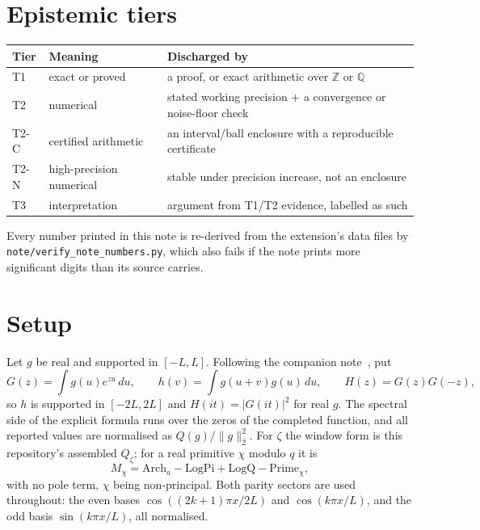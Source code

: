 \documentclass[11pt,a4paper]{article}
\theoremstyle{remark}
\newcommand{\src}[1]{{\footnotesize\texttt{#1}}}
\begin{document}
\section*{Epistemic tiers}

\begin{center}
\begin{tabular}{@{}lll@{}}
\toprule
Tier & Meaning & Discharged by \\
\midrule
T1 & exact or proved & a proof, or exact arithmetic over $\mathbb{Z}$ or $\mathbb{Q}$ \\
T2 & numerical & stated working precision $+$ a convergence or noise-floor check \\
T2-C & certified arithmetic & an interval/ball enclosure with a reproducible certificate \\
T2-N & high-precision numerical & stable under precision increase, not an enclosure \\
T3 & interpretation & argument from T1/T2 evidence, labelled as such \\
\bottomrule
\end{tabular}
\end{center}

\noindent Every number printed in this note is re-derived from the extension's data files
by \src{note/verify\_note\_numbers.py}, which also fails if the note prints more
significant digits than its source carries.

\section{Setup}\label{sec:setup}

Let $g$ be real and supported in $[-L,L]$. Following the companion note~\cite[\S2]{DHnote},
put
\[
G(z)=\int g(u)e^{zu}\,du,\qquad h(v)=\int g(u+v)g(u)\,du,\qquad H(z)=G(z)G(-z),
\]
so $h$ is supported in $[-2L,2L]$ and $H(it)=|G(it)|^2$ for real $g$. The spectral side of
the explicit formula runs over the zeros of the completed function, and all reported values
are normalised as $Q(g)/\|g\|_2^2$. For $\zeta$ the window form is this repository's
assembled $Q_\zeta$; for a real primitive $\chi$ modulo $q$ it is
\[
M_\chi=\mathrm{Arch}_a-\mathrm{LogPi}+\mathrm{LogQ}-\mathrm{Prime}_\chi ,
\]
with no pole term, $\chi$ being non-principal. Both parity sectors are used throughout:
the even bases $\cos((2k+1)\pi x/2L)$ and $\cos(k\pi x/L)$, and the odd basis
$\sin(k\pi x/L)$, all normalised.
\end{document}
